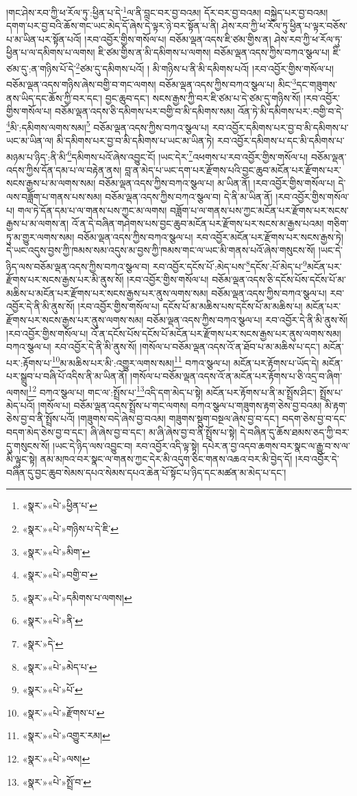 །གང་ཤེས་རབ་ཀྱི་ཕ་རོལ་ཏུ་:ཕྱིན་པ་དེ་\footnote{«སྣར་»«པེ་»ཕྱིན་པ་}ལ་ནི་བླང་བར་བྱ་བའམ། དོར་བར་བྱ་བའམ། བསྐྱེད་པར་བྱ་བའམ། དགག་པར་བྱ་བའི་ཆོས་གང་ཡང་མེད་དོ་ཞེས་དེ་ལྟར་ཉེ་བར་སྟོན་པ་ནི། ཤེས་རབ་ཀྱི་ཕ་རོལ་ཏུ་ཕྱིན་པ་ལྟར་བཅོས་པ་མ་ཡིན་པར་སྟོན་པའོ། །རབ་འབྱོར་གྱིས་གསོལ་པ། བཅོམ་ལྡན་འདས་ཇི་ཙམ་གྱིས་ན། ཤེས་རབ་ཀྱི་ཕ་རོལ་ཏུ་ཕྱིན་པ་ལ་དམིགས་པ་ལགས། ཇི་ཙམ་གྱིས་ན་མི་དམིགས་པ་ལགས། བཅོམ་ལྡན་འདས་ཀྱིས་བཀའ་སྩལ་པ། ཇི་ཙམ་དུ་:ན་གཉིས་པོ་དེ་\footnote{«སྣར་»«པེ་»གཉིས་པ་དེ་ཇི་}ཙམ་དུ་དམིགས་པའོ། །
མི་གཉིས་པ་ནི་མི་དམིགས་པའོ། །རབ་འབྱོར་གྱིས་གསོལ་པ། བཅོམ་ལྡན་འདས་གཉིས་ཞེས་བགྱི་བ་གང་ལགས། བཅོམ་ལྡན་འདས་ཀྱིས་བཀའ་སྩལ་པ། མིང་\footnote{«སྣར་»«པེ་»མིག་}དང་གཟུགས་ནས་ཡིད་དང་ཆོས་ཀྱི་བར་དང་། བྱང་ཆུབ་དང་། སངས་རྒྱས་ཀྱི་བར་ཇི་ཙམ་པ་དེ་ཙམ་དུ་གཉིས་སོ། །རབ་འབྱོར་གྱིས་གསོལ་པ། བཅོམ་ལྡན་འདས་ཅི་དམིགས་པར་བགྱི་བ་མི་དམིགས་སམ། འོན་ཏེ་མི་དམིགས་པར་:བགྱི་བ་དེ་\footnote{«སྣར་»«པེ་»བགྱི་བ་}མི་:དམིགས་ལགས་སམ།\footnote{«སྣར་»«པེ་»དམིགས་པ་ལགས།} བཅོམ་ལྡན་འདས་ཀྱིས་བཀའ་སྩལ་པ། རབ་འབྱོར་དམིགས་པར་བྱ་བ་མི་དམིགས་པ་ཡང་མ་ཡིན་ལ། མི་དམིགས་པར་བྱ་བ་མི་དམིགས་པ་ཡང་མ་ཡིན་ཏེ། རབ་འབྱོར་དམིགས་པ་དང་མི་དམིགས་པ་མཉམ་པ་ཉིད་:ནི་མི་\footnote{«སྣར་»«པེ་»ནི་}དམིགས་པའོ་ཞེས་འབྱུང་ངོ། །ཡང་དེར་\footnote{«སྣར་»དེ་}འཕགས་པ་རབ་འབྱོར་གྱིས་གསོལ་པ། བཅོམ་ལྡན་འདས་ཀྱིས་དོན་དམ་པ་ལ་བརྟེན་ནས། བླ་ན་མེད་པ་ཡང་དག་པར་རྫོགས་པའི་བྱང་ཆུབ་མངོན་པར་རྫོགས་པར་སངས་རྒྱས་པ་མ་ལགས་སམ། བཅོམ་ལྡན་འདས་ཀྱིས་བཀའ་སྩལ་པ། མ་ཡིན་ནོ། །རབ་འབྱོར་གྱིས་གསོལ་པ། དེ་ལས་བཟློག་པ་གནས་པས་སམ། བཅོམ་ལྡན་འདས་ཀྱིས་བཀའ་སྩལ་བ། དེ་ནི་མ་ཡིན་ནོ། །རབ་འབྱོར་གྱིས་གསོལ་པ། གལ་ཏེ་དོན་དམ་པ་ལ་གནས་པས་ཀྱང་མ་ལགས། བཟློག་པ་ལ་གནས་པས་ཀྱང་མངོན་པར་རྫོགས་པར་སངས་རྒྱས་པ་མ་ལགས་ན། འོ་ན་དེ་བཞིན་གཤེགས་པས་བྱང་ཆུབ་མངོན་པར་རྫོགས་པར་སངས་མ་རྒྱས་པའམ། གཅིག་ཏུ་མ་གྱུར་ལགས་སམ། བཅོམ་ལྡན་འདས་ཀྱིས་བཀའ་སྩལ་པ། རབ་འབྱོར་མངོན་པར་རྫོགས་པར་སངས་རྒྱས་ཏེ། དེ་ཡང་འདུས་བྱས་ཀྱི་ཁམས་སམ་འདུས་མ་བྱས་ཀྱི་ཁམས་གང་ལ་ཡང་མི་གནས་པའོ་ཞེས་གསུངས་སོ། །ཡང་དེ་ཉིད་ལས་བཅོམ་ལྡན་འདས་ཀྱིས་བཀའ་སྩལ་བ། རབ་འབྱོར་དངོས་པོ་:མེད་པས་\footnote{«སྣར་»«པེ་»མེད་པ་}དངོས་:པོ་མེད་པ་\footnote{«སྣར་»«པེ་»པོ་}མངོན་པར་རྫོགས་པར་སངས་རྒྱས་པར་མི་ནུས་སོ། །རབ་འབྱོར་གྱིས་གསོལ་པ། བཅོམ་ལྡན་འདས་ཅི་དངོས་པོས་དངོས་པོ་མ་མཆིས་པ་མངོན་པར་རྫོགས་པར་སངས་རྒྱས་པར་ནུས་ལགས་སམ། བཅོམ་ལྡན་འདས་ཀྱིས་བཀའ་སྩལ་པ། རབ་འབྱོར་དེ་ནི་མི་ནུས་སོ། །རབ་འབྱོར་གྱིས་གསོལ་པ། དངོས་པོ་མ་མཆིས་པས་དངོས་པོ་མ་མཆིས་པ། མངོན་པར་རྫོགས་པར་སངས་རྒྱས་པར་ནུས་ལགས་སམ། བཅོམ་ལྡན་འདས་ཀྱིས་བཀའ་སྩལ་པ། རབ་འབྱོར་དེ་ནི་མི་ནུས་སོ། །རབ་འབྱོར་གྱིས་གསོལ་པ། འོ་ན་དངོས་པོས་དངོས་པོ་མངོན་པར་རྫོགས་པར་སངས་རྒྱས་པར་ནུས་ལགས་སམ། བཀའ་སྩལ་པ། རབ་འབྱོར་དེ་ནི་མི་ནུས་སོ། །གསོལ་པ་བཅོམ་ལྡན་འདས་འོ་ན་ཐོབ་པ་མ་མཆིས་པ་དང་། མངོན་པར་:རྟོགས་པ་\footnote{«སྣར་»«པེ་»རྫོགས་པ་}མ་མཆིས་པར་མི་:འགྱུར་ལགས་སམ།\footnote{«སྣར་»«པེ་»འགྱུར་རམ།} བཀའ་སྩལ་པ། མངོན་པར་རྟོགས་པ་ཡོད་དེ། མངོན་པར་སྒྲུབ་པ་བཞི་པོ་འདིས་ནི་མ་ཡིན་ནོ། །གསོལ་པ་བཅོམ་ལྡན་འདས་འོ་ན་མངོན་པར་རྟོགས་པ་ཅི་འདྲ་བ་ཞིག་ལགས།\footnote{«སྣར་»«པེ་»ལས།} བཀའ་སྩལ་པ། གང་ལ་:སྤྲོས་པ་\footnote{«སྣར་»«པེ་»སྤྲོ་བ་}འདི་དག་མེད་པ་སྟེ། མངོན་པར་རྟོགས་པ་ནི་མ་སྤྲོས་ཤིང་། སྤྲོས་པ་མེད་པའོ། །གསོལ་པ། བཅོམ་ལྡན་འདས་སྤྲོས་པ་གང་ལགས། བཀའ་སྩལ་པ་གཟུགས་རྟག་ཅེས་བྱ་བའམ། མི་རྟག་ཅེས་བྱ་བ་ནི་སྤྲོས་པའོ། །གཟུགས་བདེ་ཞེས་བྱ་བའམ། གཟུགས་སྡུག་བསྔལ་ཞེས་བྱ་བ་དང་། བདག་ཅེས་བྱ་བ་དང་བདག་མེད་ཅེས་བྱ་བ་དང་། ཞི་ཞེས་བྱ་བ་དང་། མ་ཞི་ཞེས་བྱ་བ་ནི་སྤྲོས་པ་སྟེ། དེ་བཞིན་དུ་ཆོས་ཐམས་ཅད་ཀྱི་བར་དུ་གསུངས་སོ། །ཡང་དེ་ཉིད་ལས་འབྱུང་བ། རབ་འབྱོར་འདི་ལྟ་སྟེ། དཔེར་ན་བྱ་འདབ་ཆགས་བར་སྣང་ལ་རྒྱུ་བ་ས་ལ་མི་ལྟུང་སྟེ། ནམ་མཁའ་བར་སྣང་ལ་གནས་ཀྱང་དེར་མི་འདུག་ཅིང་གནས་འཆའ་བར་མི་བྱེད་དོ། །རབ་འབྱོར་དེ་བཞིན་དུ་བྱང་ཆུབ་སེམས་དཔའ་སེམས་དཔའ་ཆེན་པོ་སྟོང་པ་ཉིད་དང་མཚན་མ་མེད་པ་དང་། 